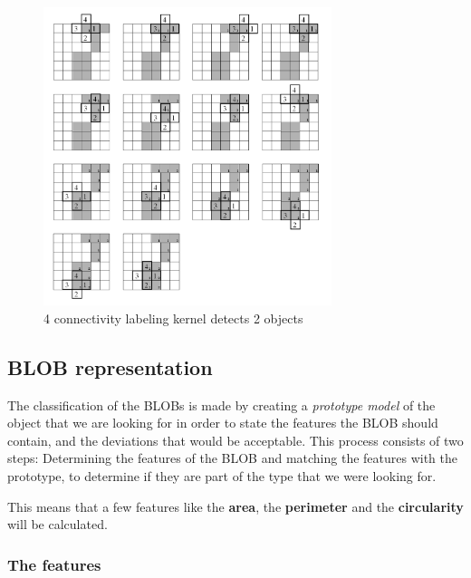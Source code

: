 \begin{figure}[htbp]
\centering
\includegraphics[width=0.75\textwidth]{Pictures/Theory/4connec_kernel.png}
\caption{4 connectivity labeling kernel detects 2 objects}
\label{fig:4connecK}
\end{figure}

\subsection{BLOB representation}
The classification of the BLOBs is made by creating a \textit{prototype model} of the object that we are looking for in order to state the features the BLOB should contain, and the deviations that would be acceptable. This process consists of two steps: Determining the features of the BLOB and matching the features with the prototype, to determine if they are part of the type that we were looking for.

This means that a few features like the \textbf{area}, the \textbf{perimeter} and the \textbf{circularity} will be calculated.
\subsubsection{The features}

